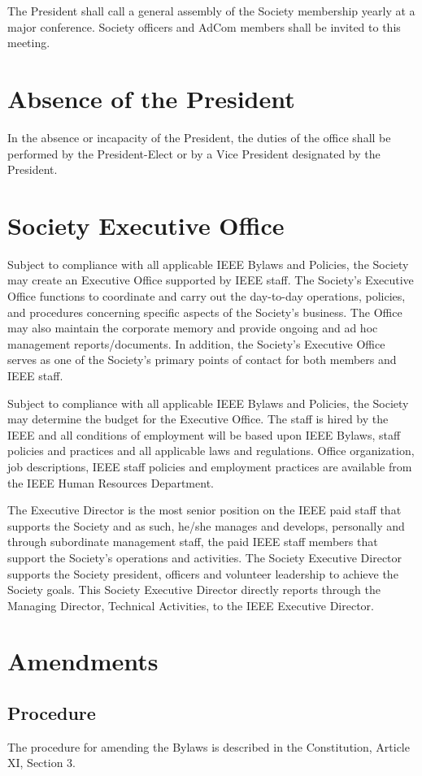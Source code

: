 \documentclass[10pt]{article}
\begin{document}
The President shall call a general assembly of the Society membership yearly at a major conference.  Society officers and AdCom members shall be invited to this meeting.


\section{Absence of the President}

In the absence or incapacity of the President, the duties of the office shall be performed by the President-Elect or by a Vice President designated by the President.

\section{Society Executive Office}

Subject to compliance with all applicable IEEE Bylaws and Policies, the Society may create an Executive Office supported by IEEE staff.  The Society's Executive Office functions to coordinate and carry out the day-to-day operations, policies, and procedures concerning specific aspects of the Society's business.  The Office may also maintain the corporate memory and provide ongoing and ad hoc management reports/documents.  In addition, the Society's Executive Office serves as one of the Society's primary points of contact for both members and IEEE staff. 

Subject to compliance with all applicable IEEE Bylaws and Policies, the Society may determine the budget for the Executive Office.  The staff is hired by the IEEE and all conditions of employment will be based upon IEEE Bylaws, staff policies and practices and all applicable laws and regulations.  Office organization, job descriptions, IEEE staff policies and employment practices are available from the IEEE Human Resources Department.  

The Executive Director is the most senior position on the IEEE paid staff that supports the Society and as such, he/she manages and develops, personally and through subordinate management staff, the paid IEEE staff members that support the Society's operations and activities.  The Society Executive Director supports the Society president, officers and volunteer leadership to achieve the Society goals. This Society Executive Director directly reports through the Managing Director, Technical Activities, to the IEEE Executive Director.


\section{Amendments}

\subsection{Procedure}

The procedure for amending the Bylaws is described in the Constitution, Article XI, Section 3. 
\end{document}
